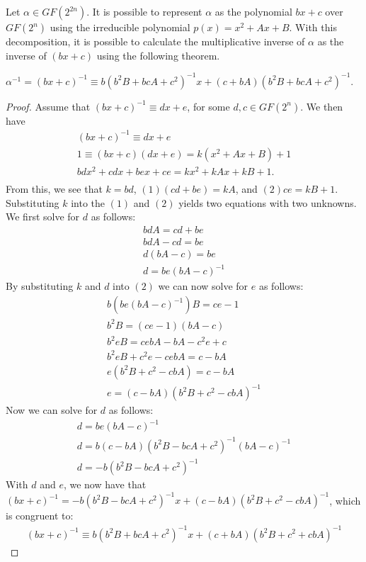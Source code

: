 \documentclass[11pt]{article}
\begin{document}

Let $\alpha \in GF(2^{2n})$. It is possible to represent $\alpha$ as the polynomial $bx + c$ over $GF(2^n)$ using 
the irreducible polynomial $p(x) = x^2 + Ax + B$. With this decomposition, it is possible to calculate the multiplicative
inverse of $\alpha$ as the inverse of $(bx + c)$ using the following theorem.

\begin{theorem}
$\alpha^{-1} = (bx + c)^{-1} \equiv b(b^2B + bcA + c^2)^{-1}x + (c + bA)(b^2B + bcA + c^2)^{-1}$.
\end{theorem}

\begin{proof}
Assume that $(bx + c)^{-1} \equiv dx + e$, for some $d,c \in GF(2^n)$. We then have
\begin{align*}
(bx + c)^{-1} \equiv dx + e \\
1 \equiv (bx + c)(dx + e) = k(x^2 + Ax + B) + 1 \\
bdx^2 + cdx + bex + ce = kx^2 + kAx + kB + 1. \\
\end{align*}
From this, we see that $k = bd$, $(1) (cd + be) = kA$, and $(2) ce = kB + 1$. Substituting $k$ into the $(1)$ and $(2)$ yields
two equations with two unknowns. We first solve for $d$ as follows:
\begin{align*}
bdA = cd + be \\
bdA - cd = be \\
d(bA - c) = be \\
d = be(bA - c)^{-1}
\end{align*}
By substituting $k$ and $d$ into $(2)$ we can now solve for $e$ as follows:
\begin{align*}
b(be(bA - c)^{-1})B = ce - 1\\
b^2B = (ce - 1)(bA - c) \\
b^2eB = cebA - bA - c^2e + c \\
b^2eB + c^2e - cebA = c - bA \\
e(b^2B + c^2 - cbA) = c - bA \\
e = (c - bA)(b^2B + c^2 - cbA)^{-1}
\end{align*}
Now we can solve for $d$ as follows:
\begin{align*}
d = be(bA - c)^{-1} \\
d = b(c - bA)(b^2B - bcA + c^2)^{-1}(bA - c)^{-1} \\
d = -b(b^2B - bcA + c^2)^{-1}
\end{align*}
With $d$ and $e$, we now have that $(bx + c)^{-1} = -b(b^2B - bcA + c^2)^{-1}x + (c - bA)(b^2B + c^2 - cbA)^{-1}$, which is congruent to:
\begin{align*}
(bx + c)^{-1} \equiv b(b^2B + bcA + c^2)^{-1}x + (c + bA)(b^2B + c^2 + cbA)^{-1}
\end{align*}
\end{proof}
\end{document}
